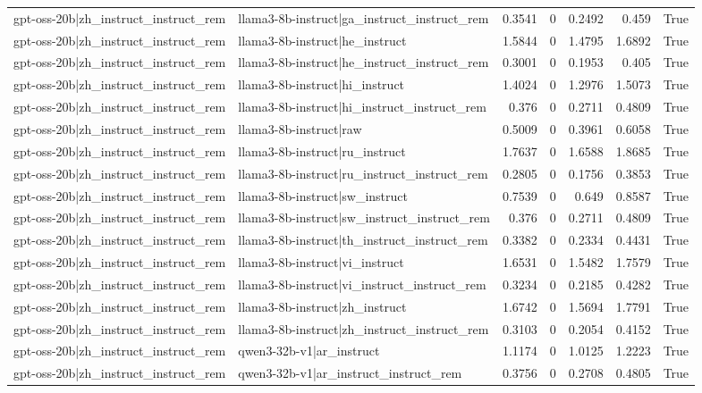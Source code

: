 \begin{table}
\begin{tabular}{l l r r r r l}
gpt-oss-20b|zh_instruct_instruct_rem & llama3-8b-instruct|ga_instruct_instruct_rem & 0.3541 & 0 & 0.2492 & 0.459 & True \\
gpt-oss-20b|zh_instruct_instruct_rem & llama3-8b-instruct|he_instruct & 1.5844 & 0 & 1.4795 & 1.6892 & True \\
gpt-oss-20b|zh_instruct_instruct_rem & llama3-8b-instruct|he_instruct_instruct_rem & 0.3001 & 0 & 0.1953 & 0.405 & True \\
gpt-oss-20b|zh_instruct_instruct_rem & llama3-8b-instruct|hi_instruct & 1.4024 & 0 & 1.2976 & 1.5073 & True \\
gpt-oss-20b|zh_instruct_instruct_rem & llama3-8b-instruct|hi_instruct_instruct_rem & 0.376 & 0 & 0.2711 & 0.4809 & True \\
gpt-oss-20b|zh_instruct_instruct_rem & llama3-8b-instruct|raw & 0.5009 & 0 & 0.3961 & 0.6058 & True \\
gpt-oss-20b|zh_instruct_instruct_rem & llama3-8b-instruct|ru_instruct & 1.7637 & 0 & 1.6588 & 1.8685 & True \\
gpt-oss-20b|zh_instruct_instruct_rem & llama3-8b-instruct|ru_instruct_instruct_rem & 0.2805 & 0 & 0.1756 & 0.3853 & True \\
gpt-oss-20b|zh_instruct_instruct_rem & llama3-8b-instruct|sw_instruct & 0.7539 & 0 & 0.649 & 0.8587 & True \\
gpt-oss-20b|zh_instruct_instruct_rem & llama3-8b-instruct|sw_instruct_instruct_rem & 0.376 & 0 & 0.2711 & 0.4809 & True \\
gpt-oss-20b|zh_instruct_instruct_rem & llama3-8b-instruct|th_instruct_instruct_rem & 0.3382 & 0 & 0.2334 & 0.4431 & True \\
gpt-oss-20b|zh_instruct_instruct_rem & llama3-8b-instruct|vi_instruct & 1.6531 & 0 & 1.5482 & 1.7579 & True \\
gpt-oss-20b|zh_instruct_instruct_rem & llama3-8b-instruct|vi_instruct_instruct_rem & 0.3234 & 0 & 0.2185 & 0.4282 & True \\
gpt-oss-20b|zh_instruct_instruct_rem & llama3-8b-instruct|zh_instruct & 1.6742 & 0 & 1.5694 & 1.7791 & True \\
gpt-oss-20b|zh_instruct_instruct_rem & llama3-8b-instruct|zh_instruct_instruct_rem & 0.3103 & 0 & 0.2054 & 0.4152 & True \\
gpt-oss-20b|zh_instruct_instruct_rem & qwen3-32b-v1|ar_instruct & 1.1174 & 0 & 1.0125 & 1.2223 & True \\
gpt-oss-20b|zh_instruct_instruct_rem & qwen3-32b-v1|ar_instruct_instruct_rem & 0.3756 & 0 & 0.2708 & 0.4805 & True \\

\end{tabular}
\end{table}
